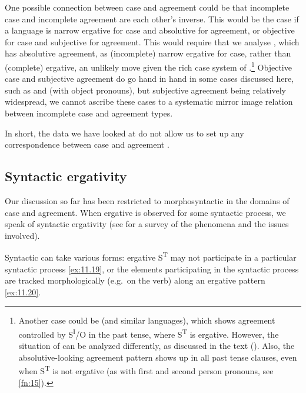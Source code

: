 \documentclass[output=paper]{langsci/langscibook}
\begin{document}
One possible connection between case and agreement  could be
that incomplete case  and incomplete agreement 
are each other’s inverse. This would be the case if a language is narrow
ergative for case and absolutive for agreement, or objective for case and
subjective for agreement.  This would require that we analyse , which
has absolutive agreement, as (incomplete) narrow ergative for case, rather than
(complete) ergative, an unlikely move given the rich case system of 
\citep{Polinsky2014}.\footnote{Another case could be  (and similar
    languages), which shows agreement controlled by S\textsuperscript{I}/O in
    the past tense, where S\textsuperscript{T} is ergative. However, the
    situation of  can be analyzed differently, as discussed in the
    text ().  Also, the absolutive-looking agreement pattern shows up in all past
    tense clauses, even when S\textsuperscript{T} is not ergative (as with
first and second person pronouns, see \cref{fn:15}).} Objective case and
subjective agreement do go hand in hand in some cases discussed here, such as
 and  (with object pronouns), but subjective
agreement being relatively widespread, we cannot ascribe these cases to a
systematic mirror image relation between incomplete case and agreement types.

In short, the data we have looked at do not allow us to set up any
correspondence between case and agreement .

\subsection{Syntactic ergativity}\label{sec:11.5.5}

Our discussion so far has been restricted to morphosyntactic  in
the domains of case and agreement. When ergative  is observed
for some syntactic process, we speak of syntactic ergativity
(see \citealt{Deal2016} for a survey of the phenomena and the issues involved).

Syntactic  can take various forms: ergative S\textsuperscript{T} may
not participate in a particular syntactic process \eqref{ex:11.19}, or the elements
participating in the syntactic process are tracked morphologically (e.g.\ on
the verb) along an ergative  pattern
\eqref{ex:11.20}.\newpage
\end{document}

